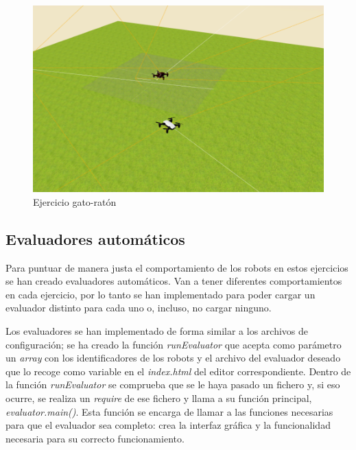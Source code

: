     
\begin{figure}[H]
    \centering           
    \includegraphics[scale=0.35]{img/ejercicio_gatoraton.png}
    \caption{Ejercicio gato-ratón}
    \label{fig:gato_raton}
\end{figure}


\subsection{Evaluadores automáticos}

Para puntuar de manera justa el comportamiento de los robots en estos ejercicios se han creado evaluadores automáticos. Van a tener diferentes comportamientos en cada ejercicio, por lo tanto se han implementado para poder cargar un evaluador distinto para cada uno o, incluso, no cargar ninguno. \newline

Los evaluadores se han implementado de forma similar a los archivos de configuración; se ha creado la función \textit{runEvaluator} que acepta como parámetro un \textit{array} con los identificadores de los robots y el archivo del evaluador deseado que lo recoge como variable en el \textit{index.html} del editor correspondiente. 
Dentro de la función \textit{runEvaluator} se comprueba que se le haya pasado un fichero y, si eso ocurre, se realiza un \textit{require} de ese fichero y llama a su función principal, \textit{evaluator.main()}. Esta función se encarga de llamar a las funciones necesarias para que el evaluador sea completo: crea la interfaz gráfica y la funcionalidad necesaria para su correcto funcionamiento. 

